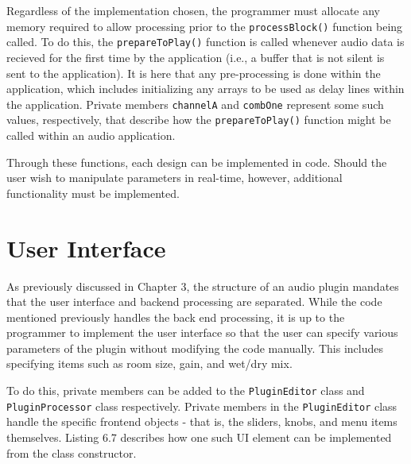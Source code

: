 \begin{singlespace}

\end{singlespace} \hfill \break
\hspace*{0.6cm}Regardless of the implementation chosen, the programmer must allocate any memory required to allow processing prior to the \verb|processBlock()| function being called. To do this, the \verb|prepareToPlay()| function is called whenever audio data is recieved for the first time by the application (i.e., a buffer that is not silent is sent to the application). It is here that any pre-processing is done within the application, which includes initializing any arrays to be used as delay lines within the application. Private members \verb|channelA| and \verb|combOne| represent some such values, respectively, that describe how the \verb|prepareToPlay()| function might be called within an audio application.

\begin{singlespace}

\end{singlespace} \hfill \break
\hspace*{0.6cm}Through these functions, each design can be implemented in code. Should the user wish to manipulate parameters in real-time, however, additional functionality must be implemented.

\section{User Interface}
As previously discussed in Chapter 3, the structure of an audio plugin mandates that the user interface and backend processing are separated. While the code mentioned previously handles the back end processing, it is up to the programmer to implement the user interface so that the user can specify various parameters of the plugin without modifying the code manually. This includes specifying items such as room size, gain, and wet/dry mix.

To do this, private members can be added to the \verb|PluginEditor| class and \verb|PluginProcessor| class respectively. Private members in the \verb|PluginEditor| class handle the specific frontend objects - that is, the sliders, knobs, and menu items themselves. Listing 6.7 describes how one such UI element can be implemented from the class constructor.

